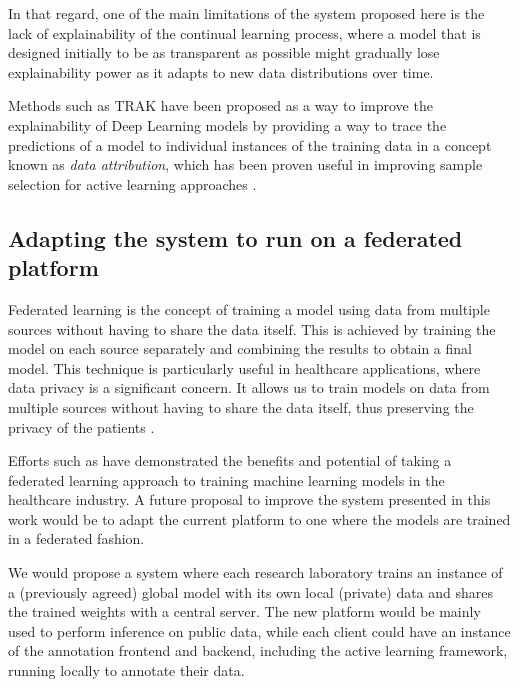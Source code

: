 \documentclass[../main.tex]{subfiles}
\begin{document}
    In that regard, one of the main limitations of the system proposed here is the lack of explainability of the continual learning process, where a model that is designed initially to be as transparent as possible might gradually lose explainability power as it adapts to new data distributions over time.
    
    
    
    Methods such as TRAK \cite{park_trak_2023} have been proposed as a way to improve the explainability of Deep Learning models by providing a way to trace the predictions of a model to individual instances of the training data in a concept known as \textit{data attribution}, which has been proven useful in improving sample selection for active learning approaches \cite{park_trak_2023, holzmuller_framework_2023, liu_influence_2021}.

    \subsection{Adapting the system to run on a federated platform} \label{conclusions:future_work:federated} 


    Federated learning is the concept of training a model using data from multiple sources without having to share the data itself. This is achieved by training the model on each source separately and combining the results to obtain a final model. This technique is particularly useful in healthcare applications, where data privacy is a significant concern. It allows us to train models on data from multiple sources without having to share the data itself, thus preserving the privacy of the patients \cite{joshi_federated_2022}.

    Efforts such as \cite{joshi_federated_2022} have demonstrated the benefits and potential of taking a federated learning approach to training machine learning models in the healthcare industry. A future proposal to improve the system presented in this work would be to adapt the current platform to one where the models are trained in a federated fashion.
    
    We would propose a system where each research laboratory trains an instance of a (previously agreed) global model with its own local (private) data and shares the trained weights with a central server. The new platform would be mainly used to perform inference on public data, while each client could have an instance of the annotation frontend and backend, including the active learning framework, running locally to annotate their data. 
    
\end{document}

